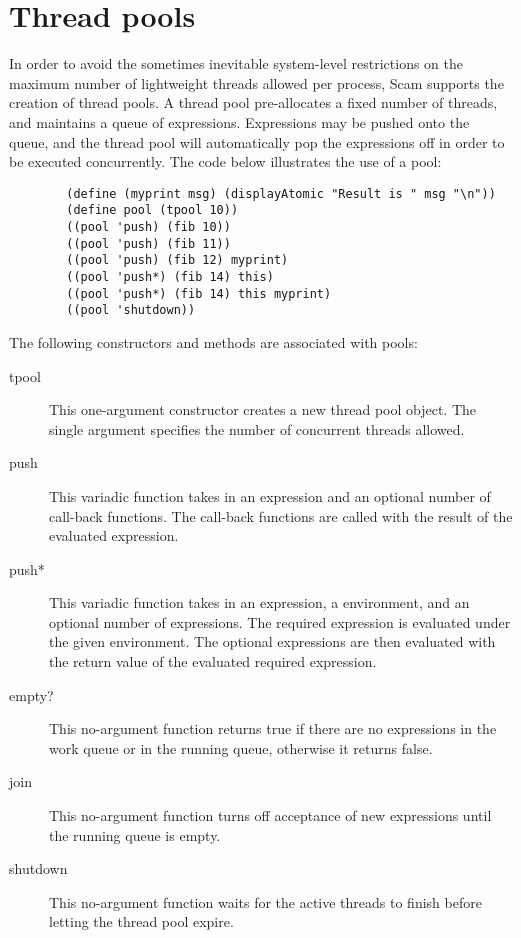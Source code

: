 \section{Thread pools}
In order to avoid the sometimes inevitable system-level restrictions
on the maximum number of lightweight threads allowed per process, Scam
supports the creation of thread pools.  A thread pool pre-allocates
a fixed number of threads, and maintains a queue of expressions.
Expressions may be pushed onto the queue, and the thread pool
will automatically pop the expressions off in order to be executed
concurrently.  The code below
illustrates the use of a pool:

    \begin{verbatim}
        (define (myprint msg) (displayAtomic "Result is " msg "\n"))
        (define pool (tpool 10))
        ((pool 'push) (fib 10))
        ((pool 'push) (fib 11))
        ((pool 'push) (fib 12) myprint)
        ((pool 'push*) (fib 14) this)
        ((pool 'push*) (fib 14) this myprint)
        ((pool 'shutdown))
    \end{verbatim} 


The following constructors and methods are associated with pools:

\begin{description}
\item[tpool]
This one-argument constructor creates a new thread pool object.
The single argument specifies the number of concurrent threads allowed.

\item[push]
This variadic function takes in an expression and an optional
number of call-back functions.  The call-back functions are called
with the result of the evaluated expression.

\item[push*]
This variadic function takes in an expression, a environment,
and an optional number of expressions. 
The required expression is evaluated under the given environment.
The optional expressions are then evaluated with the return value
of the evaluated required expression.
\item[empty?]

This no-argument function returns true if there are no expressions
in the work queue or in the running queue, otherwise it returns
false.

\item[join]
This no-argument function turns off acceptance of new expressions
until the running queue is empty.

\item[shutdown]
This no-argument function waits for the active threads to finish
before letting the thread pool expire.
\end{description}

